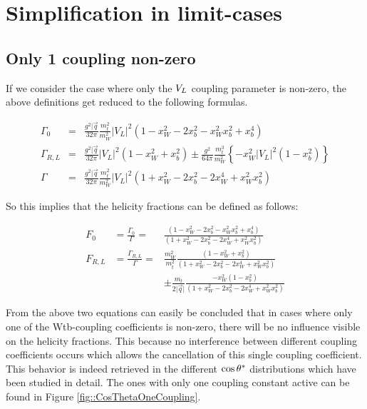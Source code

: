 \section{Simplification in limit-cases}
\subsection{Only 1 coupling non-zero}
If we consider the case where only the $V_{L}$ coupling parameter is non-zero, the above definitions get reduced to the following formulas.

\begin{eqnarray}
 \Gamma_{0} & = & \frac{g^{2} \vert \vec{q}}{32 \pi} \frac{m_{t}^{2}}{m_{W}^{2}} \vert V_{L} \vert^{2} (1 - x_{W}^{2} - 2x_{b}^{2} -x_{W}^{2} x_{b}^{2} + x_{b}^{4}) \\
 \Gamma_{R,L} & = & \frac{g^{2} \vert \vec{q}}{32 \pi}  \vert V_{L} \vert^{2} (1 - x_{W}^{2} + x_{b}^{2}) \pm \frac{g^{2}}{64 \pi} \frac{m_{t}^{3}}{m_{W}^{2}} \left\lbrace -x_{W}^{2}  \vert V_{L} \vert^{2} (1-x_{b}^{2}) \right\rbrace \\
 \Gamma & = & \frac{g^{2} \vert \vec{q}}{32 \pi} \frac{m_{t}^{2}}{m_{W}^{2}} \vert V_{L} \vert^{2} (1 + x_{W}^{2} - 2x_{b}^{2} - 2 x_{W}^{4} + x_{W}^{2} x_{b}^{2})
\end{eqnarray}

So this implies that the helicity fractions can be defined as follows:

\begin{eqnarray}
 F_{0}   & = \frac{\Gamma_{0}}{\Gamma} =   & \frac{(1 - x_{W}^{2} - 2x_{b}^{2} -x_{W}^{2} x_{b}^{2} + x_{b}^{4})}{(1 + x_{W}^{2} - 2x_{b}^{2} - 2 x_{W}^{4} + x_{W}^{2} x_{b}^{2})} \label{eq::F0MasslessB} \\
 F_{R,L} & = \frac{\Gamma_{R,L}}{\Gamma} = & \frac{m_{W}^{2}}{m_{t}^{2}} \frac{(1 - x_{W}^{2} + x_{b}^{2})}{(1 + x_{W}^{2} - 2x_{b}^{2} - 2 x_{W}^{4} + x_{W}^{2} x_{b}^{2})} \nonumber \\
         &                                 & \pm \frac{m_{t}}{2 \vert \vec{q} \vert} \frac{ -x_{W}^{2} (1-x_{b}^{2})}{(1 + x_{W}^{2} - 2x_{b}^{2} - 2 x_{W}^{4} + x_{W}^{2} x_{b}^{2})} \label{eq::FRLMasslessB}
\end{eqnarray}

From the above two equations can easily be concluded that in cases where only one of the Wtb-coupling coefficients is non-zero, there will be no influence visible on the helicity fractions. This because no interference between different coupling coefficients occurs which allows the cancellation of this single coupling coefficient. This behavior is indeed retrieved in the different $\cos \theta^{*}$ distributions which have been studied in detail. The ones with only one coupling constant active can be found in Figure \ref{fig::CosThetaOneCoupling}.\\

